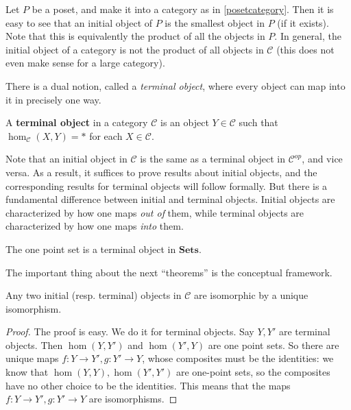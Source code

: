 \begin{example} 
Let $P$ be a poset, and make it into a category as in \cref{posetcategory}.
Then it is easy to see that an initial object of $P$ is the smallest object in
$P$ (if it exists). Note that this is equivalently the product of all the
objects in $P$. In general, the initial object of a category is not the product
of all objects in $\mathcal{C}$ (this does not even make sense for a large
category).
\end{example} 

There is a dual notion, called a \textit{terminal object}, where every object
can map into it in precisely one way.
\begin{definition}
A \textbf{terminal object} in a category $\mathcal{C}$ is an object $Y \in
\mathcal{C}$ such that $\hom_{\mathcal{C}}(X, Y) = \ast$ for each $X \in \mathcal{C}$.
\end{definition}

Note that an initial object in $\mathcal{C}$ is the same as a terminal object
in $\mathcal{C}^{op}$, and vice versa. As a result, it suffices to prove 
results about initial objects, and the corresponding results for terminal
objects will follow formally.
But there is a fundamental difference between initial and terminal objects.
Initial objects are characterized by how one maps \emph{out of} them, while
terminal objects are characterized by how one maps \emph{into} them. 
\begin{example}
The one point set is a terminal object in $\mathbf{Sets}$.
\end{example}



The important thing about the next ``theorems'' is the conceptual framework.
\begin{proposition}
\label{initialunique}
Any two initial (resp. terminal) objects in $\mathcal{C}$ are isomorphic by a
unique isomorphism.
\end{proposition}
\begin{proof}
The proof is easy. We do it for terminal objects. Say $Y, Y'$ are
terminal objects. Then $\hom(Y, Y')$ and $\hom(Y', Y)$ are one
point sets. So there are unique maps $f: Y \to Y', g: Y' \to Y$, whose composites
must be the identities: we know that $\hom(Y, Y) , \hom(Y', Y')$
are one-point sets, so the composites have no other choice to be the
identities. This means that the maps $f: Y \to Y', g: Y' \to Y$ are
isomorphisms.
\end{proof}

